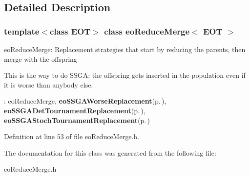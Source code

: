 \subsection{Detailed Description}
\subsubsection*{template$<$class EOT$>$ class eo\-Reduce\-Merge$<$ EOT $>$}

eo\-Reduce\-Merge: Replacement strategies that start by reducing the parents, then merge with the offspring 

This is the way to do SSGA: the offspring gets inserted in the population even if it is worse than anybody else.

: eo\-Reduce\-Merge, {\bf eo\-SSGAWorse\-Replacement}{\rm (p.\,\pageref{classeo_s_s_g_a_worse_replacement})}, {\bf eo\-SSGADet\-Tournament\-Replacement}{\rm (p.\,\pageref{classeo_s_s_g_a_det_tournament_replacement})}, {\bf eo\-SSGAStoch\-Tournament\-Replacement}{\rm (p.\,\pageref{classeo_s_s_g_a_stoch_tournament_replacement})} 



Definition at line 53 of file eo\-Reduce\-Merge.h.

The documentation for this class was generated from the following file:\begin{CompactItemize}
\item 
eo\-Reduce\-Merge.h\end{CompactItemize}
